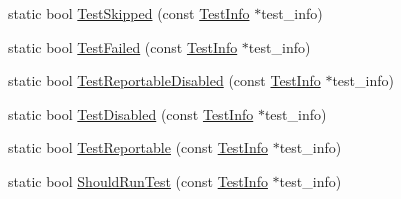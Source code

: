\begin{DoxyCompactItemize}
\item 
static bool \mbox{\hyperlink{classtesting_1_1_test_suite_a0e162a1f49f40049a5b16fe989dc75e7}{Test\+Skipped}} (const \mbox{\hyperlink{classtesting_1_1_test_info}{Test\+Info}} $\ast$test\+\_\+info)
\item 
static bool \mbox{\hyperlink{classtesting_1_1_test_suite_ae4a91afa37c495d36bf30dd9d6cf0e9c}{Test\+Failed}} (const \mbox{\hyperlink{classtesting_1_1_test_info}{Test\+Info}} $\ast$test\+\_\+info)
\item 
static bool \mbox{\hyperlink{classtesting_1_1_test_suite_a6f9748db6f3382f65c747bcc2bc46b4c}{Test\+Reportable\+Disabled}} (const \mbox{\hyperlink{classtesting_1_1_test_info}{Test\+Info}} $\ast$test\+\_\+info)
\item 
static bool \mbox{\hyperlink{classtesting_1_1_test_suite_a01cf264bd705388df0778160ed433b93}{Test\+Disabled}} (const \mbox{\hyperlink{classtesting_1_1_test_info}{Test\+Info}} $\ast$test\+\_\+info)
\item 
static bool \mbox{\hyperlink{classtesting_1_1_test_suite_a939aba8925d609fb5d01464edad0b4d7}{Test\+Reportable}} (const \mbox{\hyperlink{classtesting_1_1_test_info}{Test\+Info}} $\ast$test\+\_\+info)
\item 
static bool \mbox{\hyperlink{classtesting_1_1_test_suite_ad6db30ec4e23a809f398dc2f50008541}{Should\+Run\+Test}} (const \mbox{\hyperlink{classtesting_1_1_test_info}{Test\+Info}} $\ast$test\+\_\+info)
\end{DoxyCompactItemize}
